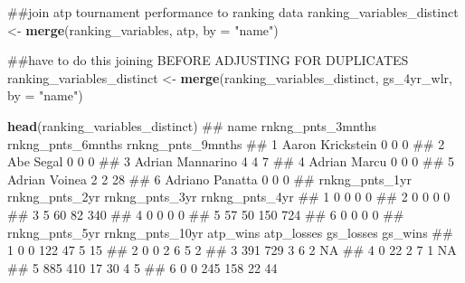 \documentclass[]{article}
\newenvironment{Shaded}{\begin{snugshade}}{\end{snugshade}}
\newcommand{\KeywordTok}[1]{\textcolor[rgb]{0.13,0.29,0.53}{\textbf{#1}}}
\newcommand{\DataTypeTok}[1]{\textcolor[rgb]{0.13,0.29,0.53}{#1}}
\newcommand{\StringTok}[1]{\textcolor[rgb]{0.31,0.60,0.02}{#1}}
\newcommand{\NormalTok}[1]{#1}
\begin{document}
\begin{Shaded}
\begin{Highlighting}[]
\NormalTok{##join atp tournament performance to ranking data}
\NormalTok{ranking_variables_distinct <-}\StringTok{ }\KeywordTok{merge}\NormalTok{(ranking_variables, atp, }\DataTypeTok{by =} \StringTok{"name"}\NormalTok{)}


\NormalTok{##have to do this joining BEFORE ADJUSTING FOR DUPLICATES}
\NormalTok{ranking_variables_distinct <-}\StringTok{ }\KeywordTok{merge}\NormalTok{(ranking_variables_distinct, gs_4yr_wlr, }\DataTypeTok{by =} \StringTok{"name"}\NormalTok{)}


\KeywordTok{head}\NormalTok{(ranking_variables_distinct)}
\NormalTok{##               name rnkng_pnts_3mnths rnkng_pnts_6mnths rnkng_pnts_9mnths}
\NormalTok{## 1 Aaron Krickstein                 0                 0                 0}
\NormalTok{## 2        Abe Segal                 0                 0                 0}
\NormalTok{## 3 Adrian Mannarino                 4                 4                 7}
\NormalTok{## 4     Adrian Marcu                 0                 0                 0}
\NormalTok{## 5    Adrian Voinea                 2                 2                28}
\NormalTok{## 6  Adriano Panatta                 0                 0                 0}
\NormalTok{##   rnkng_pnts_1yr rnkng_pnts_2yr rnkng_pnts_3yr rnkng_pnts_4yr}
\NormalTok{## 1              0              0              0              0}
\NormalTok{## 2              0              0              0              0}
\NormalTok{## 3              5             60             82            340}
\NormalTok{## 4              0              0              0              0}
\NormalTok{## 5             57             50            150            724}
\NormalTok{## 6              0              0              0              0}
\NormalTok{##   rnkng_pnts_5yr rnkng_pnts_10yr atp_wins atp_losses gs_losses gs_wins}
\NormalTok{## 1              0               0      122         47         5      15}
\NormalTok{## 2              0               0        2          6         5       2}
\NormalTok{## 3            391             729        3          6         2      NA}
\NormalTok{## 4              0              22        2          7         1      NA}
\NormalTok{## 5            885             410       17         30         4       5}
\NormalTok{## 6              0               0      245        158        22      44}
\end{Highlighting}
\end{Shaded}
\end{document}
